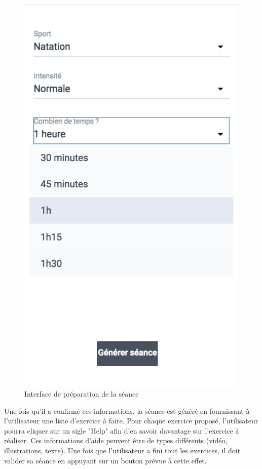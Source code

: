 \begin{figure}[!h]
\includegraphics[scale=0.3]{ihms/seance4}
\caption{Interface de préparation de la séance}
\end{figure}

Une fois qu'il a confirmé ces informations, la séance est généré en fournissant à l'utilisateur une liste d'exercice à faire. Pour chaque exercice proposé, l'utilisateur pourra cliquer sur un sigle "Help" afin d'en savoir davantage sur l'exercice à réaliser. Ces informations d'aide peuvent être de types différents (vidéo, illustrations, texte). Une fois que l'utilisateur a fini tout les exercices, il doit valider sa séance en appuyant sur un bouton prévue à cette effet.\\ 

